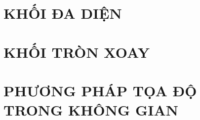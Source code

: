\documentclass[12pt,a4paper,twoside]{book}
\theoremstyle{nonumberplain}
\begin{document}
\tableofcontents

\chapter{KHỐI ĐA DIỆN}
	\setcounter{section}{0}
	
	\newpage
	\newpage

\chapter{KHỐI TRÒN XOAY}
	\setcounter{section}{0}
	

\chapter{PHƯƠNG PHÁP TỌA ĐỘ TRONG KHÔNG GIAN}
	\setcounter{section}{0}
	
	\newpage
	\newpage
	\newpage
\end{document}
